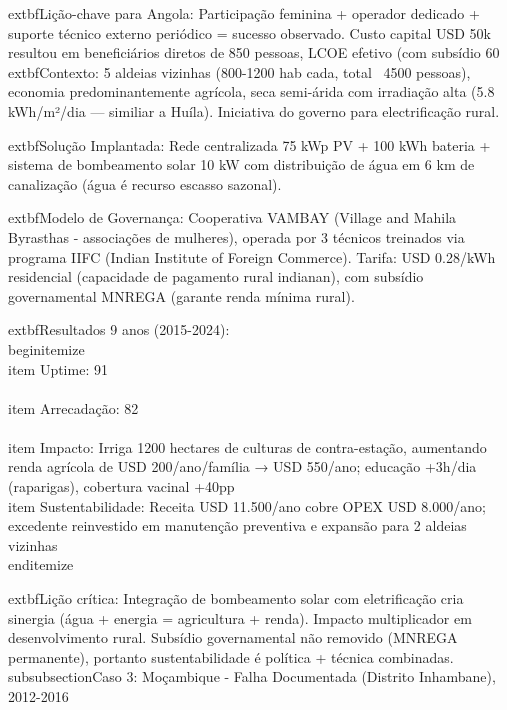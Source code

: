 \documentclass[12pt, a4paper]{article}
\begin{document}
{	extbf{Lição-chave para Angola:} Participação feminina + operador dedicado + suporte técnico externo periódico = sucesso observado. Custo capital USD 50k resultou em beneficiários diretos de 850 pessoas, LCOE efetivo (com subsídio 60\\%

	extbf{Contexto:} 5 aldeias vizinhas (800-1200 hab cada, total ~4500 pessoas), economia predominantemente agrícola, seca semi-árida com irradiação alta (5.8 kWh/m²/dia — similiar a Huíla). Iniciativa do governo para electrificação rural.

	extbf{Solução Implantada:} Rede centralizada 75 kWp PV + 100 kWh bateria + sistema de bombeamento solar 10 kW com distribuição de água em 6 km de canalização (água é recurso escasso sazonal).

	extbf{Modelo de Governança:} Cooperativa VAMBAY (Village and Mahila Byrasthas - associações de mulheres), operada por 3 técnicos treinados via programa IIFC (Indian Institute of Foreign Commerce). Tarifa: USD 0.28/kWh residencial (capacidade de pagamento rural indianan), com subsídio governamental MNREGA (garante renda mínima rural).

	extbf{Resultados 9 anos (2015-2024):}
\\begin{itemize}
\\item Uptime: 91\\%
\\item Arrecadação: 82\\%
\\item Impacto: Irriga 1200 hectares de culturas de contra-estação, aumentando renda agrícola de USD 200/ano/família → USD 550/ano; educação +3h/dia (raparigas), cobertura vacinal +40pp
\\item Sustentabilidade: Receita USD 11.500/ano cobre OPEX USD 8.000/ano; excedente reinvestido em manutenção preventiva e expansão para 2 aldeias vizinhas
\\end{itemize}

	extbf{Lição crítica:} Integração de bombeamento solar com eletrificação cria sinergia (água + energia = agricultura + renda). Impacto multiplicador em desenvolvimento rural. Subsídio governamental não removido (MNREGA permanente), portanto sustentabilidade é política + técnica combinadas.\n\n\\subsubsection{Caso 3: Moçambique - Falha Documentada (Distrito Inhambane), 2012-2016}

}
\end{document}

